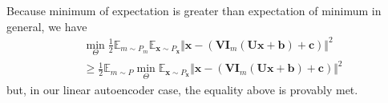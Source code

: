 \documentclass{article}
\begin{document}
    Because minimum of expectation is greater than expectation of minimum in general, we have
    \begin{align}
    &\min_{\Theta} \frac{1}{2} \mathbb{E}_{m \sim P_m} \mathbb{E}_{\mathbf{x} \sim P_\mathbf{x}} \Vert \mathbf{x} - \left( \mathbf{V} \mathbf{I}_m \left( \mathbf{U} \mathbf{x} + \mathbf{b} \right) + \mathbf{c} \right) \Vert^2 \nonumber \\
    &\geq  \frac{1}{2} \mathbb{E}_{m \sim P} \min_{\Theta}  \mathbb{E}_{\mathbf{x} \sim P_\mathbf{x}} \Vert \mathbf{x} - \left( \mathbf{V} \mathbf{I}_m \left( \mathbf{U} \mathbf{x} + \mathbf{b} \right) + \mathbf{c} \right) \Vert^2
    \label{ineq:min_E_vs_E_min}
    \end{align} 
    but, in our linear autoencoder case, the equality above is provably met.
    
\end{document}
